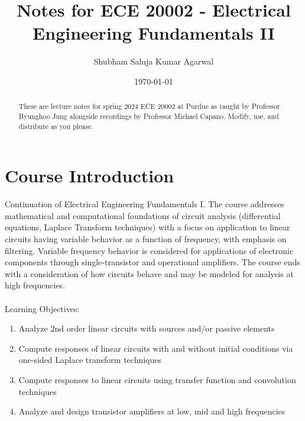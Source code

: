 \documentclass[nobib]{tufte-handout}
\title{Notes for ECE 20002 - Electrical Engineering Fundamentals II}
\author[Shubham Saluja Kumar Agarwal]{Shubham Saluja Kumar Agarwal}
\date{\today}  %
\begin{document}
\maketitle

\begin{abstract}
    These are lecture notes for spring 2024 ECE 20002 at Purdue as taught by Professor Byunghoo Jung alongside recordings by Professor Michael Capano. Modify, use, and distribute as you please.
\end{abstract}

\tableofcontents

\section{Course Introduction}

Continuation of Electrical Engineering Fundamentals I. The course addresses
mathematical and computational foundations of circuit analysis (differential
equations, Laplace Transform techniques) with a focus on application to linear
circuits having variable behavior as a function of frequency, with emphasis on
filtering. Variable frequency behavior is considered for applications of
electronic components through single-transistor and operational amplifiers. The
course ends with a consideration of how circuits behave and may be modeled for
analysis at high frequencies.\\~\\ Learning Objectives:
\begin{enumerate}
    \item Analyze 2nd order linear circuits with sources and/or passive elements
    \item Compute responses of linear circuits with and without initial conditions via
          one-sided Laplace transform techniques
    \item Compute responses to linear circuits using transfer function and convolution
          techniques
    \item Analyze and design transistor amplifiers at low, mid and high frequencies
\end{enumerate}

\pagebreak
\end{document}
